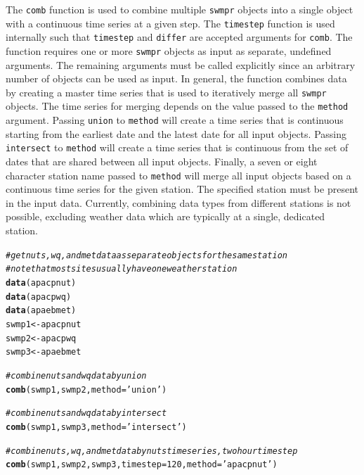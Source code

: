 \documentclass[10pt,letterpaper]{article}\usepackage[]{graphicx}\usepackage[]{color}
\makeatletter
\newcommand{\hlnum}[1]{\textcolor[rgb]{0.686,0.059,0.569}{#1}}%
\newcommand{\hlstr}[1]{\textcolor[rgb]{0.192,0.494,0.8}{#1}}%
\newcommand{\hlcom}[1]{\textcolor[rgb]{0.678,0.584,0.686}{\textit{#1}}}%
\newcommand{\hlstd}[1]{\textcolor[rgb]{0.345,0.345,0.345}{#1}}%
\newcommand{\hlkwb}[1]{\textcolor[rgb]{0.69,0.353,0.396}{#1}}%
\newcommand{\hlkwc}[1]{\textcolor[rgb]{0.333,0.667,0.333}{#1}}%
\newcommand{\hlkwd}[1]{\textcolor[rgb]{0.737,0.353,0.396}{\textbf{#1}}}%
\newenvironment{kframe}{%
 \def\at@end@of@kframe{}%
 \ifinner\ifhmode%
  \def\at@end@of@kframe{\end{minipage}}%
  \begin{minipage}{\columnwidth}%
 \fi\fi%
 \def\FrameCommand##1{\hskip\@totalleftmargin \hskip-\fboxsep
 \colorbox{shadecolor}{##1}\hskip-\fboxsep
     \hskip-\linewidth \hskip-\@totalleftmargin \hskip\columnwidth}%
 \MakeFramed {\advance\hsize-\width
   \@totalleftmargin\z@ \linewidth\hsize
   \@setminipage}}%
 {\par\unskip\endMakeFramed%
 \at@end@of@kframe}
\newenvironment{knitrout}{}{} %
\makeatother
\begin{document}
The \texttt{comb} function is used to combine multiple \texttt{swmpr} objects into a single object with a continuous time series at a given step.  The \texttt{timestep} function is used internally such that \texttt{timestep} and \texttt{differ} are accepted arguments for \texttt{comb}.  The function requires one or more \texttt{swmpr} objects as input as separate, undefined arguments.  The remaining arguments must be called explicitly since an arbitrary number of objects can be used as input.  In general, the function combines data by creating a master time series that is used to iteratively merge all \texttt{swmpr} objects.  The time series for merging depends on the value passed to the \texttt{method} argument.  Passing \texttt{union} to \texttt{method} will create a time series that is continuous starting from the earliest date and the latest date for all input objects.  Passing \texttt{intersect} to \texttt{method} will create a time series that is continuous from the set of dates that are shared between all input objects.  Finally, a seven or eight character station name passed to \texttt{method} will merge all input objects based on a continuous time series for the given station.  The specified station must be present in the input data.  Currently, combining data types from different stations is not possible, excluding weather data which are typically at a single, dedicated station.  

\begin{knitrout}
\color{fgcolor}\begin{kframe}
\begin{alltt}
\hlcom{# get nuts, wq, and met data as separate objects for the same station}
\hlcom{# note that most sites usually have one weather station}
\hlkwd{data}\hlstd{(apacpnut)}
\hlkwd{data}\hlstd{(apacpwq)}
\hlkwd{data}\hlstd{(apaebmet)}
\hlstd{swmp1} \hlkwb{<-} \hlstd{apacpnut}
\hlstd{swmp2} \hlkwb{<-} \hlstd{apacpwq}
\hlstd{swmp3} \hlkwb{<-} \hlstd{apaebmet}

\hlcom{# combine nuts and wq data by union}
\hlkwd{comb}\hlstd{(swmp1, swmp2,} \hlkwc{method} \hlstd{=} \hlstr{'union'}\hlstd{)}

\hlcom{# combine nuts and wq data by intersect}
\hlkwd{comb}\hlstd{(swmp1, swmp3,} \hlkwc{method} \hlstd{=} \hlstr{'intersect'}\hlstd{)}

\hlcom{# combine nuts, wq, and met data by nuts time series, two hour time step}
\hlkwd{comb}\hlstd{(swmp1, swmp2, swmp3,} \hlkwc{timestep} \hlstd{=} \hlnum{120}\hlstd{,} \hlkwc{method} \hlstd{=} \hlstr{'apacpnut'}\hlstd{)}
\end{alltt}
\end{kframe}
\end{knitrout}
\end{document}
